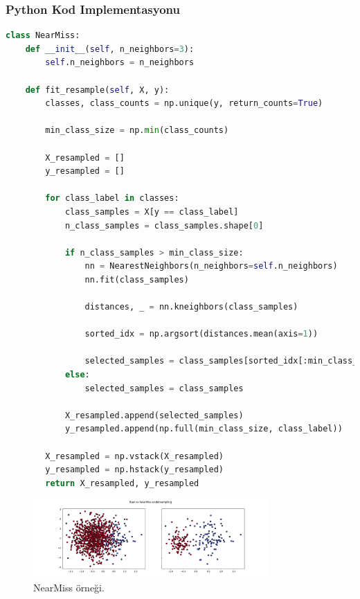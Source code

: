 \subsubsection{Python Kod Implementasyonu}

\begin{lstlisting}[language=Python]
class NearMiss:
    def __init__(self, n_neighbors=3):
        self.n_neighbors = n_neighbors

    def fit_resample(self, X, y):
        classes, class_counts = np.unique(y, return_counts=True)
        
        min_class_size = np.min(class_counts)
        
        X_resampled = []
        y_resampled = []
        
        for class_label in classes:
            class_samples = X[y == class_label]
            n_class_samples = class_samples.shape[0]
            
            if n_class_samples > min_class_size:
                nn = NearestNeighbors(n_neighbors=self.n_neighbors)
                nn.fit(class_samples)
                
                distances, _ = nn.kneighbors(class_samples)
                
                sorted_idx = np.argsort(distances.mean(axis=1))
                
                selected_samples = class_samples[sorted_idx[:min_class_size]]
            else:
                selected_samples = class_samples
            
            X_resampled.append(selected_samples)
            y_resampled.append(np.full(min_class_size, class_label))
        
        X_resampled = np.vstack(X_resampled)
        y_resampled = np.hstack(y_resampled)
        return X_resampled, y_resampled
\end{lstlisting}

\newpage

\begin{figure}[h]
    \centering
    \includegraphics[width=0.8\textwidth]{images/Raw vs NearMiss undersampling.png}
    \caption{NearMiss örneği.}
    \label{fig:enter-label}
\end{figure}

